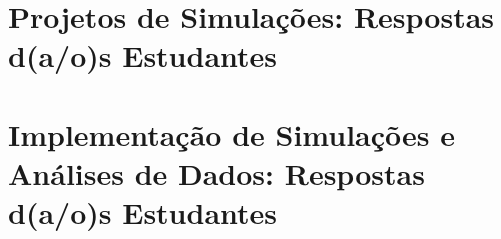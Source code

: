 \documentclass[12pt]{book}
\begin{document}
%

\part{Projetos de Simulações: Respostas d(a/o)s Estudantes\label{part:projetos:simulacoes}}

%

\part{Implementação de Simulações e Análises de Dados: Respostas d(a/o)s Estudantes\label{part:implement:simulacoes}}

%



\end{document}
